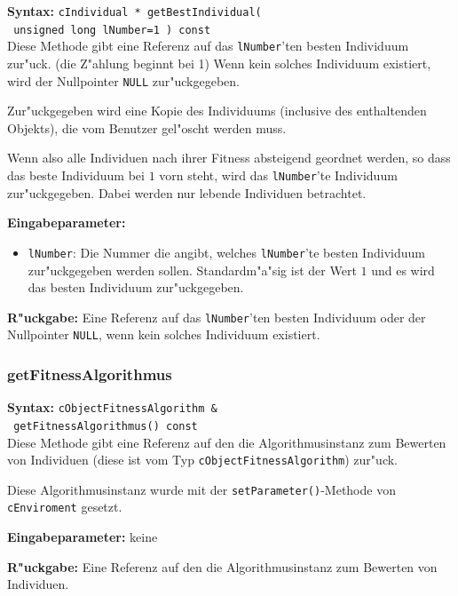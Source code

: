 \textbf{Syntax:} \verb|cIndividual * getBestIndividual(| \\\verb| unsigned long lNumber=1 ) const| \\

Diese Methode gibt eine Referenz auf das \verb|lNumber|'ten besten Individuum zur"uck. (die Z"ahlung beginnt bei 1) Wenn kein solches Individuum existiert, wird der Nullpointer \verb|NULL| zur"uckgegeben.

Zur"uckgegeben wird eine Kopie des Individuums (inclusive des enthaltenden Objekts), die vom Benutzer gel"oscht werden muss.

Wenn also alle Individuen nach ihrer Fitness absteigend geordnet werden, so dass das beste Individuum bei $1$ vorn steht, wird das \verb|lNumber|'te Individuum zur"uckgegeben.
Dabei werden nur lebende Individuen betrachtet.

\bigskip\noindent
\textbf{Eingabeparameter:}
\begin{itemize}
 \item \verb|lNumber|: Die Nummer die angibt, welches \verb|lNumber|'te besten Individuum zur"uckgegeben werden sollen. Standardm"a"sig ist der Wert $1$ und es wird das besten Individuum zur"uckgegeben.
\end{itemize}

\bigskip\noindent
\textbf{R"uckgabe:} Eine Referenz auf das \verb|lNumber|'ten besten Individuum oder der Nullpointer \verb|NULL|, wenn kein solches Individuum existiert.


\subsubsection{getFitnessAlgorithmus}

\textbf{Syntax:} \verb|cObjectFitnessAlgorithm &| \\\verb| getFitnessAlgorithmus() const| \\

Diese Methode gibt eine Referenz auf den die Algorithmusinstanz zum Bewerten von Individuen (diese ist vom Typ \verb|cObjectFitnessAlgorithm|) zur"uck.

Diese Algorithmusinstanz wurde mit der \verb|setParameter()|-Methode von \verb|cEnviroment| gesetzt.

\bigskip\noindent
\textbf{Eingabeparameter:} keine

\bigskip\noindent
\textbf{R"uckgabe:} Eine Referenz auf den die Algorithmusinstanz zum Bewerten von Individuen.


